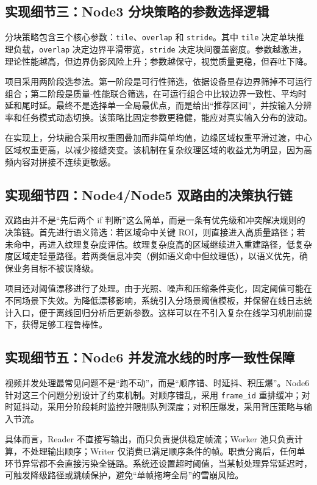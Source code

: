 \documentclass[12pt,a4paper]{ctexart}
\begin{document}
\subsection{实现细节三：Node3 分块策略的参数选择逻辑}

分块策略包含三个核心参数：\texttt{tile}、\texttt{overlap} 和 \texttt{stride}。其中 \texttt{tile} 决定单块推理负载，\texttt{overlap} 决定边界平滑带宽，\texttt{stride} 决定块间覆盖密度。参数越激进，理论性能越高，但边界伪影风险上升；参数越保守，视觉质量更稳，但吞吐下降。

项目采用两阶段选参法。第一阶段是可行性筛选，依据设备显存边界筛掉不可运行组合；第二阶段是质量-性能联合筛选，在可运行组合中比较边界一致性、平均时延和尾时延。最终不是选择单一全局最优点，而是给出“推荐区间”，并按输入分辨率和任务模式动态切换。该策略比固定参数更稳健，能应对真实输入分布的波动。

在实现上，分块融合采用权重图叠加而非简单均值，边缘区域权重平滑过渡，中心区域权重更高，以减少接缝突变。该机制在复杂纹理区域的收益尤为明显，因为高频内容对拼接不连续更敏感。

\subsection{实现细节四：Node4/Node5 双路由的决策执行链}

双路由并不是“先后两个 if 判断”这么简单，而是一条有优先级和冲突解决规则的决策链。首先进行语义筛选：若区域命中关键 ROI，则直接进入高质量路径；若未命中，再进入纹理复杂度评估。纹理复杂度高的区域继续进入重建路径，低复杂度区域走轻量路径。若两类信息冲突（例如语义命中但纹理低），以语义优先，确保业务目标不被误降级。

项目还对阈值漂移进行了处理。由于光照、噪声和压缩条件变化，固定阈值可能在不同场景下失效。为降低漂移影响，系统引入分场景阈值模板，并保留在线日志统计入口，便于离线回归分析后更新参数。这样可以在不引入复杂在线学习机制前提下，获得足够工程鲁棒性。

\subsection{实现细节五：Node6 并发流水线的时序一致性保障}

视频并发处理最常见问题不是“跑不动”，而是“顺序错、时延抖、积压爆”。Node6 针对这三个问题分别设计了约束机制。对顺序错乱，采用 \texttt{frame\_id} 重排缓冲；对时延抖动，采用分阶段耗时监控并限制队列深度；对积压爆发，采用背压策略与输入节流。

具体而言，Reader 不直接写输出，而只负责提供稳定帧流；Worker 池只负责计算，不处理输出顺序；Writer 仅消费已满足顺序条件的帧。职责分离后，任何单环节异常都不会直接污染全链路。系统还设置超时阈值，当某帧处理异常延迟时，可触发降级路径或跳帧保护，避免“单帧拖垮全局”的雪崩风险。
\end{document}
